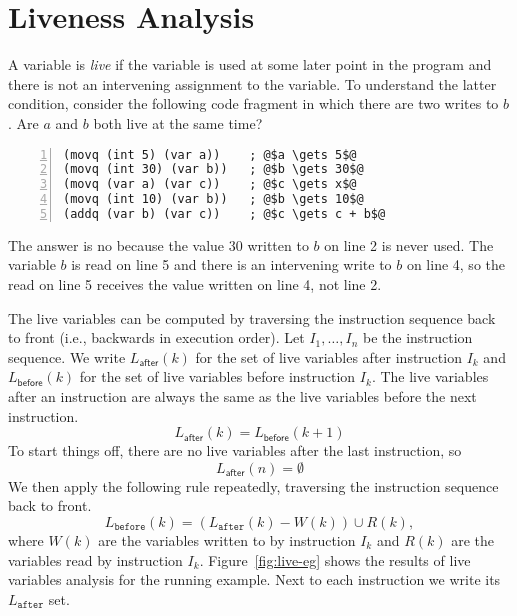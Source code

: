 \documentclass[12pt]{book}
\begin{document}
\section{Liveness Analysis}

A variable is \emph{live} if the variable is used at some later point
in the program and there is not an intervening assignment to the
variable.
%
To understand the latter condition, consider the following code
fragment in which there are two writes to $b$. Are $a$ and
$b$ both live at the same time? 
\begin{lstlisting}[numbers=left,numberstyle=\tiny]
(movq (int 5) (var a))    ; @$a \gets 5$@
(movq (int 30) (var b))   ; @$b \gets 30$@
(movq (var a) (var c))    ; @$c \gets x$@
(movq (int 10) (var b))   ; @$b \gets 10$@
(addq (var b) (var c))    ; @$c \gets c + b$@
\end{lstlisting}
The answer is no because the value $30$ written to $b$ on line 2 is
never used. The variable $b$ is read on line 5 and there is an
intervening write to $b$ on line 4, so the read on line 5 receives the
value written on line 4, not line 2.

The live variables can be computed by traversing the instruction
sequence back to front (i.e., backwards in execution order).  Let
$I_1,\ldots, I_n$ be the instruction sequence. We write
$L_{\mathsf{after}}(k)$ for the set of live variables after
instruction $I_k$ and $L_{\mathsf{before}}(k)$ for the set of live
variables before instruction $I_k$. The live variables after an
instruction are always the same as the live variables before the next
instruction.
\begin{equation*}
  L_{\mathsf{after}}(k) = L_{\mathsf{before}}(k+1)
\end{equation*}
To start things off, there are no live variables after the last
instruction, so 
\begin{equation*}
  L_{\mathsf{after}}(n) = \emptyset 
\end{equation*}
We then apply the following rule repeatedly, traversing the
instruction sequence back to front.
\begin{equation*}
  L_{\mathtt{before}}(k) = (L_{\mathtt{after}}(k) - W(k)) \cup R(k),
\end{equation*}
where $W(k)$ are the variables written to by instruction $I_k$ and
$R(k)$ are the variables read by instruction $I_k$.
Figure~\ref{fig:live-eg} shows the results of live variables analysis
for the running example. Next to each instruction we write its
$L_{\mathtt{after}}$ set.
\end{document}
